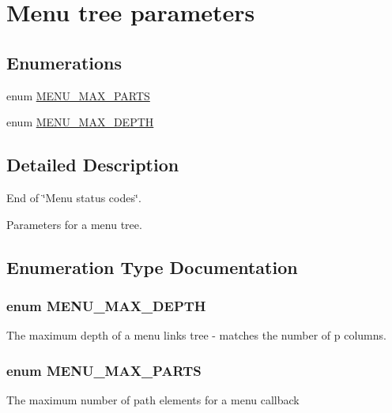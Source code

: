 \hypertarget{group__menu__tree__parameters}{
\section{Menu tree parameters}
\label{group__menu__tree__parameters}
}
\subsection*{Enumerations}
\begin{DoxyCompactItemize}
\item 
enum \hyperlink{group__menu__tree__parameters_ga57d50c60b259e886bac766d4ef33abb5}{MENU\_\-MAX\_\-PARTS} 
\item 
enum \hyperlink{group__menu__tree__parameters_gaae0d9e2610b50124cc0d2b120058c9b8}{MENU\_\-MAX\_\-DEPTH} 
\end{DoxyCompactItemize}


\subsection{Detailed Description}
End of \char`\"{}Menu status codes\char`\"{}.

Parameters for a menu tree. 

\subsection{Enumeration Type Documentation}
\hypertarget{group__menu__tree__parameters_gaae0d9e2610b50124cc0d2b120058c9b8}{
\subsubsection[{MENU\_\-MAX\_\-DEPTH}]{\setlength{\rightskip}{0pt plus 5cm}enum {\bf MENU\_\-MAX\_\-DEPTH}}}
\label{group__menu__tree__parameters_gaae0d9e2610b50124cc0d2b120058c9b8}
The maximum depth of a menu links tree -\/ matches the number of p columns. \hypertarget{group__menu__tree__parameters_ga57d50c60b259e886bac766d4ef33abb5}{
\subsubsection[{MENU\_\-MAX\_\-PARTS}]{\setlength{\rightskip}{0pt plus 5cm}enum {\bf MENU\_\-MAX\_\-PARTS}}}
\label{group__menu__tree__parameters_ga57d50c60b259e886bac766d4ef33abb5}
The maximum number of path elements for a menu callback 